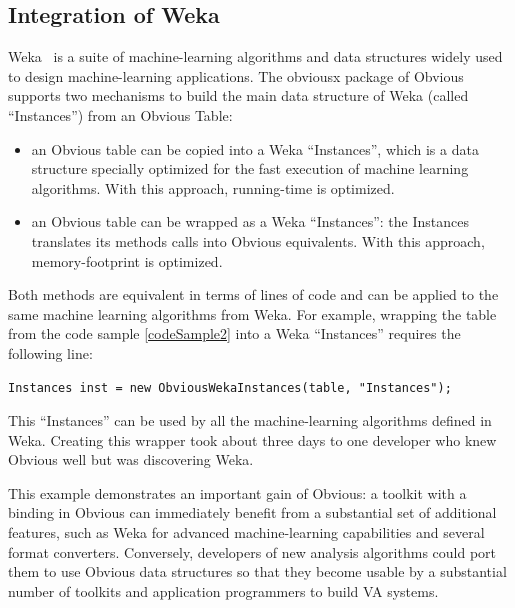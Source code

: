 \subsection{Integration of Weka}

Weka~\cite{Weka} is a suite of machine-learning algorithms and data
structures widely used to design machine-learning applications.  
The obviousx package of Obvious supports two mechanisms to build the
main data structure of Weka (called ``Instances'') from an Obvious
Table:

\begin{itemize}[noitemsep]
\item an Obvious table can be copied into a Weka ``Instances'', which
  is a data structure specially optimized for the fast execution of
   machine learning algorithms.  With this approach, running-time is
   optimized.
\item an Obvious table can be wrapped as a Weka ``Instances'': the
  Instances translates its methods calls into Obvious equivalents.
  With this approach, memory-footprint is optimized.
\end{itemize}

Both methods are equivalent in terms of lines of code and can be
applied to the same machine learning algorithms from Weka.  For
example, wrapping the table from the code sample \ref{codeSample2}
into a Weka ``Instances''  requires the following line:

\begin{lstlisting}[caption={Wrapping an Obvious Table into Weka Instances},label=wekaExample]
Instances inst = new ObviousWekaInstances(table, "Instances");
\end{lstlisting}


This ``Instances'' can be used by all the machine-learning algorithms
defined in Weka.  Creating this wrapper took about three days to one
developer who knew Obvious well but was discovering Weka.

This example demonstrates an important gain of Obvious: a toolkit with
a binding in Obvious can immediately benefit from a substantial set of
additional features, such as Weka for advanced machine-learning
capabilities and several format converters.  Conversely, developers of
new analysis algorithms could port them to use Obvious data structures
so that they become usable by a substantial number of toolkits and
application programmers to build VA systems.


